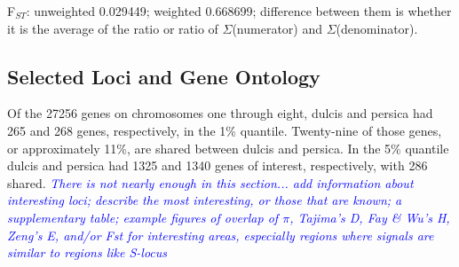 \documentclass[12pt]{article}
\newcommand{\jri}[1]{\textcolor{red}{\emph{#1}}}
\newcommand{\dv}[1]{\textcolor{blue}{\emph{#1}}}
\begin{document}
F$_{ST}$: unweighted 0.029449; weighted 0.668699; difference between them is whether it is the average of the ratio or ratio of $\Sigma$(numerator) and $\Sigma$(denominator).

%
\subsection*{Selected Loci and Gene Ontology}
Of the 27256 genes on chromosomes one through eight, dulcis and persica had 265 and 268 genes, respectively, in the 1\% quantile. 
%
Twenty-nine of those genes, or approximately 11\%, are shared between dulcis and persica.
%
In the 5\% quantile dulcis and persica had 1325 and 1340 genes of interest, respectively, with 286 shared.
%
\dv{There is not nearly enough in this section... add information about interesting loci; describe the most interesting, or those that are known; a supplementary table; example figures of overlap of $\pi$, Tajima's D, Fay & Wu's H, Zeng's E, and/or Fst for interesting areas, especially regions where signals are similar to regions like S-locus}
% 
%
\end{document}
